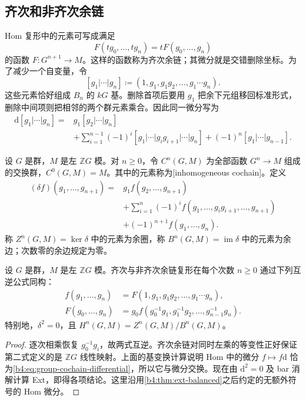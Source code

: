 \subsection{齐次和非齐次余链}
\label{b4:subsec:1101:03}

Hom 复形中的元素可写成满足
\[
F(tg_0,\ldots,tg_n)=tF(g_0,\ldots,g_n)
\]
的函数 \(F:G^{n+1}\to M\)。这样的函数称为齐次余链；其微分就是交错删除坐标。为了减少一个自变量，令
\[
[g_1|\cdots|g_n]\coloneqq(1,g_1,g_1g_2,\ldots,g_1\cdots g_n).
\]
这些元素恰好组成 \(B_n\) 的 \(kG\) 基。删除首项后要用 \(g_1\) 把余下元组移回标准形式，删除中间项则把相邻的两个群元素乘合。因此同一微分写为
\[
\begin{split}
\mathrm{d}[g_1|\cdots|g_n]
={}&g_1[g_2|\cdots|g_n]\\
&+\sum_{i=1}^{n-1}(-1)^i[g_1|\cdots|g_i g_{i+1}|\cdots|g_n]
+(-1)^n[g_1|\cdots|g_{n-1}].
\end{split}
\]

\begin{definition}\label{b4:def:group-inhomogeneous-cochains}
设 \(G\) 是群，\(M\) 是左 \(\mathbb ZG\) 模。对 \(n\ge0\)，令 \(C^n(G,M)\) 为全部函数 \(G^n\to M\) 组成的交换群，\(C^0(G,M)=M\)。其中的元素称为[inhomogeneous cochain]。定义
\begin{equation}\label{b4:eq:group-cochain-differential}
\begin{split}
(\delta f)(g_1,\ldots,g_{n+1})
={}&g_1f(g_2,\ldots,g_{n+1})\\
&+\sum_{i=1}^{n}(-1)^i f(g_1,\ldots,g_i g_{i+1},\ldots,g_{n+1})\\
&+(-1)^{n+1}f(g_1,\ldots,g_n).
\end{split}
\end{equation}
称 \(Z^n(G,M)=\ker\delta\) 中的元素为余圈，称 \(B^n(G,M)=\operatorname{im}\delta\) 中的元素为余边；次数零的余边规定为零。
\end{definition}

\begin{proposition}\label{b4:prop:group-cochain-model}
设 \(G\) 是群，\(M\) 是左 \(\mathbb ZG\) 模。齐次与非齐次余链复形在每个次数 \(n\ge0\) 通过下列互逆公式同构：
\[
\begin{split}
f(g_1,\ldots,g_n)&=F(1,g_1,g_1g_2,\ldots,g_1\cdots g_n),\\
F(g_0,\ldots,g_n)&=g_0f(g_0^{-1}g_1,g_1^{-1}g_2,\ldots,g_{n-1}^{-1}g_n).
\end{split}
\]
特别地，\(\delta^2=0\)，且 \(H^n(G,M)=Z^n(G,M)/B^n(G,M)\)。
\end{proposition}
\begin{proof}
逐次相乘恢复 \(g_0^{-1}g_i\)，故两式互逆。齐次余链对同时左乘的等变性正好保证第二式定义的是 \(\mathbb ZG\) 线性映射。上面的基变换计算说明 Hom 中的微分 \(f\mapsto f\mathrm{d}\) 恰为\eqref{b4:eq:group-cochain-differential}，所以它与微分交换。现在由 \(\mathrm{d}^2=0\) 及 bar 消解计算 Ext，即得各项结论。这里沿用\cref{b4:thm:ext-balanced}之后约定的无额外符号的 Hom 微分。
\end{proof}

